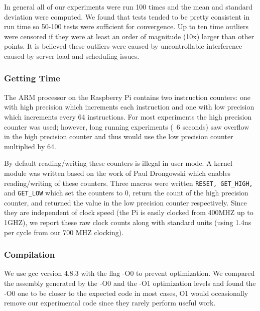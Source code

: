 In general all of our experiments were run 100 times and the mean and standard deviation were computed.
We found that tests tended to be pretty consistent in run time so 50-100 tests were sufficient for convergence.
Up to ten time outliers were censored if they were at least an order of magnitude (10x) larger than other points.  
It is believed these outliers were caused by uncontrollable interference caused by server load and scheduling issues.

\subsubsection{Getting Time}
The ARM processor on the Raspberry Pi contains two instruction counters: one with high precision which increments each instruction and one with low precision which increments every 64 instructions.
For most experiments the high precision counter was used; however, long running experiments (~6 seconds) saw overflow in the high precision counter and thus would use the low precision counter multiplied by 64.  

By default reading/writing these counters is illegal in user mode. 
A kernel module was written based on the work of Paul Drongowski\cite{sand} which enables reading/writing of these counters.
Three macros were written {\tt RESET, GET\_HIGH,} and {\tt GET\_LOW} which set the counters to 0, return the count of the high precision counter, and returned the value in the low precision counter respectively.
Since they are independent of clock speed (the Pi is easily clocked from 400MHZ up to 1GHZ), we report these raw clock counts along with standard units (using 1.4ns per cycle from our 700 MHZ clocking).


\subsubsection{Compilation}
We use gcc version 4.8.3 with the flag -O0 to prevent optimization.
We compared the assembly generated by the -O0 and the -O1 optimization levels and found the -O0 one to be closer to the expected code in most cases, O1 would occasionally remove our experimental code since they rarely perform useful work.